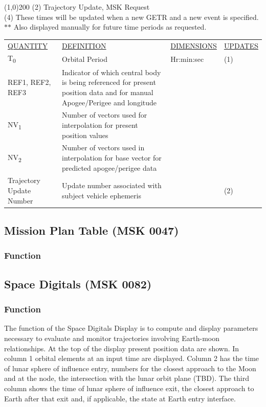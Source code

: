 \documentclass[11pt]{article} %
\begin{document}
\line(1,0){200}
(2) Trajectory Update, MSK Request\\
(4) These times will be updated when a new GETR and a new event is specified.\\
$\ast$$\ast$ Also displayed manually for future time periods as requested.\\
\newpage

\begin{center}
\begin{tabular}{ L{2.9cm} L{4.6cm} L{3cm} L{3.8cm} }
\underline{QUANTITY} & \underline{DEFINITION} & \underline{DIMENSIONS} & \underline{UPDATES} \\
T\textsubscript{0}&Orbital Period&Hr:min:sec&(1)\\
REF1, REF2, REF3&Indicator of which central body is being referenced for present position data and for manual Apogee/Perigee and longitude&&\\
NV\textsubscript{1}&Number of vectors used for interpolation for present position values&&\\
NV\textsubscript{2}&Number of vectors used in interpolation for base vector for predicted apogee/perigee data&&\\
Trajectory Update Number&Update number associated with subject vehicle ephemeris&&(2)\\
\end{tabular}
\end{center}

\subsection{Mission Plan Table (MSK 0047)}

\subsubsection{Function}

\newpage

\subsection{Space Digitals (MSK 0082)}

\subsubsection{Function}

The function of the Space Digitals Display is to compute and display parameters necessary to evaluate and monitor trajectories involving Earth-moon relationships. At the top of the display present position data are shown. In column 1 orbital elements at an input time are displayed. Column 2 has the time of lunar sphere of influence entry, numbers for the closest approach to the Moon and at the node, the intersection with the lunar orbit plane (TBD). The third column shows the time of lunar sphere of influence exit, the closest approach to Earth after that exit and, if applicable, the state at Earth entry interface.
\end{document}
